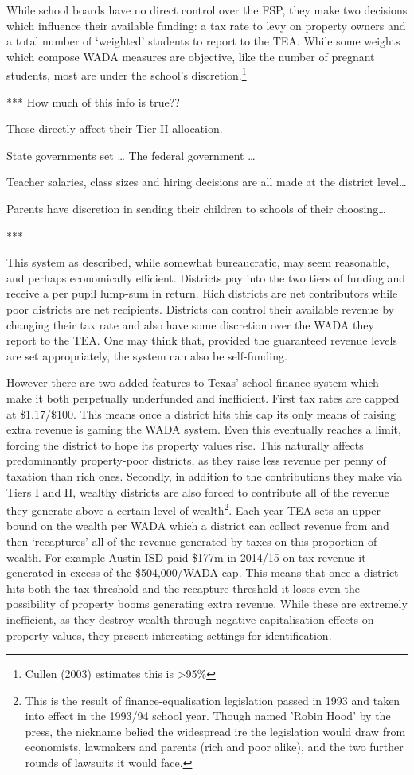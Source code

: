\documentclass[11pt]{article}
\begin{document}
While school boards have no direct control over the FSP, they make two decisions which influence their available funding: a tax rate to levy on property owners and a total number of ‘weighted’ students to report to the TEA. While some weights which compose WADA measures are objective, like the number of pregnant students, most are under the school's discretion.\footnote{Cullen (2003) estimates this is \textgreater95\%}

***
How much of this info is true??


These directly affect their Tier II allocation. 

State governments set … The federal government …

Teacher salaries, class sizes and hiring decisions are all made at the district level… 

Parents have discretion in sending their children to schools of their choosing… 

***

This system as described, while somewhat bureaucratic, may seem reasonable, and perhaps economically efficient. Districts pay into the two tiers of funding and receive a per pupil lump-sum in return. Rich districts are net contributors while poor districts are net recipients. Districts can control their available revenue by changing their tax rate and also have some discretion over the WADA they report to the TEA. One may think that, provided the guaranteed revenue levels are set appropriately, the system can also be self-funding. 

However there are two added features to Texas’ school finance system which make it both perpetually underfunded and inefficient. First tax rates are capped at \$1.17/\$100. This means once a district hits this cap its only means of raising extra revenue is gaming the WADA system. Even this eventually reaches a limit, forcing the district to hope its property values rise. This naturally affects predominantly property-poor districts, as they raise less revenue per penny of taxation than rich ones. Secondly, in addition to the contributions they make via Tiers I and II, wealthy districts are also forced to contribute all of the revenue they generate above a certain level of wealth\footnote{This is the result of finance-equalisation legislation passed in 1993 and taken into effect in the 1993/94 school year. Though named 'Robin Hood' by the press, the nickname belied the widespread ire the legislation would draw from economists, lawmakers and parents (rich and poor alike), and the two further rounds of lawsuits it would face.}. Each year TEA sets an upper bound on the wealth per WADA which a district can collect revenue from and then ‘recaptures’ all of the revenue generated by taxes on this proportion of wealth. For example Austin ISD paid \$177m in 2014/15 on tax revenue it generated in excess of the \$504,000/WADA cap. This means that once a district hits both the tax threshold and the recapture threshold it loses even the possibility of property booms generating extra revenue. While these are extremely inefficient, as they destroy wealth through negative capitalisation effects on property values, they present interesting settings for identification. 
\end{document}
